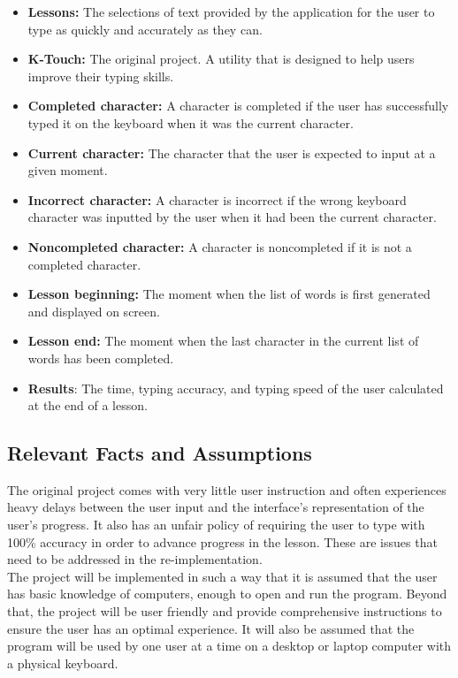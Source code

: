 \documentclass[12pt, titlepage]{article}
\begin{document}
\begin{itemize}
    \item \textbf{Lessons:} The selections of text provided by the application for the user to type as quickly and accurately as they can.
    \item \textbf{K-Touch:} The original project. A utility that is designed to help users improve their typing skills.
    \item\textbf{Completed character:} A character is completed if the user has successfully typed it on the keyboard when it was the current character. 
    \item \textbf{Current character:} The character that the user is expected to input at a given moment.
    \item\textbf{Incorrect character:} A character is incorrect if the wrong keyboard character was inputted by the user when it had been the current character.
    \item\textbf{Noncompleted character:} A character is noncompleted if it is not a completed character.
    \item \textbf{Lesson beginning:} The moment when the list of words is first generated and displayed on screen.
    \item \textbf{Lesson end:} The moment when the last character in the current list of words has been completed.
    \item \textbf{Results}: {\color{cyan}The time, typing accuracy, and typing speed of the user calculated at the end of a lesson.}
\end{itemize}

\subsection{Relevant Facts and Assumptions}
\indent \indent The original project comes with very little user instruction and often experiences heavy delays between the user input and the interface's representation of the user's progress. It also has an unfair policy of requiring the user to type with 100\% accuracy in order to advance progress in the lesson. These are issues that need to be addressed in the re-implementation.
\\
\indent The project will be implemented in such a way that it is assumed that the user has basic knowledge of computers, enough to open and run the program. Beyond that, the project will be user friendly and provide comprehensive instructions to ensure the user has an optimal experience. It will also be assumed that the program will be used by one user at a time on a desktop or laptop computer with a physical keyboard.
\end{document}
